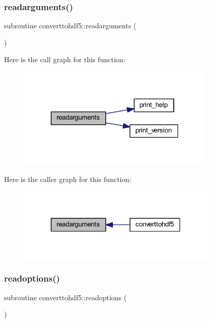 \subsubsection{\texorpdfstring{readarguments()}{readarguments()}}
{\footnotesize\ttfamily subroutine converttohdf5\+::readarguments (\begin{DoxyParamCaption}{ }\end{DoxyParamCaption})}

Here is the call graph for this function\+:\nopagebreak
\begin{figure}[H]
\begin{center}
\leavevmode
\includegraphics[width=268pt]{_convert_to_h_d_f5_8_f90_adf9fee08c1e27d953753809c2a20cbdd_cgraph}
\end{center}
\end{figure}
Here is the caller graph for this function\+:\nopagebreak
\begin{figure}[H]
\begin{center}
\leavevmode
\includegraphics[width=271pt]{_convert_to_h_d_f5_8_f90_adf9fee08c1e27d953753809c2a20cbdd_icgraph}
\end{center}
\end{figure}
\mbox{\label{_convert_to_h_d_f5_8_f90_a2233a80cf5c89674ce4f80d91531c0ea}} 
\subsubsection{\texorpdfstring{readoptions()}{readoptions()}}
{\footnotesize\ttfamily subroutine converttohdf5\+::readoptions (\begin{DoxyParamCaption}{ }\end{DoxyParamCaption})}

